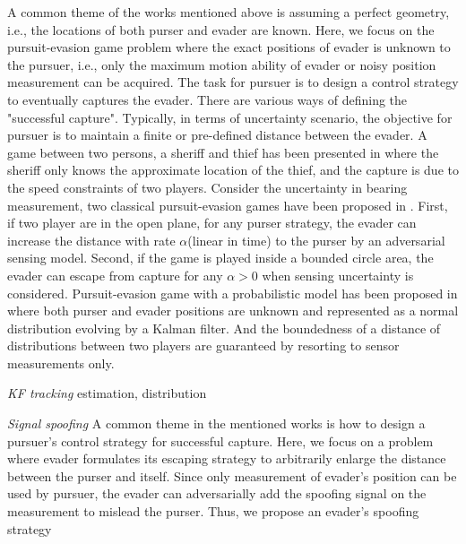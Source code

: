 \documentclass[letterpaper, 10 pt, conference]{ieeeconf}  %
\begin{document}
A common theme of the works mentioned above is assuming a perfect geometry, i.e., the locations of both purser and evader are known. Here, we focus on the pursuit-evasion game problem where the exact positions of evader is unknown to the pursuer, i.e., only the maximum motion ability of evader or noisy position measurement can be acquired\cite{guibas1999visibility,rote2003pursuit,lavalle2006planning,jun2014pursuit,vander2014pursuit,aleem2015self}. The task for pursuer is to design a control strategy to eventually captures the evader. There are various ways of defining the "successful capture". Typically, in terms of uncertainty scenario, the objective for pursuer is to maintain a finite or pre-defined distance between the evader\cite{jun2014pursuit}. A game between two persons, a sheriff and thief has been presented in \cite{rote2003pursuit} where the sheriff only knows the approximate location of the thief, and the capture is due to the speed constraints of two players. Consider the uncertainty in bearing measurement, two classical pursuit-evasion games have been proposed in \cite{vander2014pursuit}. First, if two player are in the open plane, for any purser strategy, the evader can increase the distance with rate $\alpha$(linear in time) to the purser by an adversarial sensing model. Second, if the game is played inside a bounded circle area, the evader can escape from capture for any $\alpha>0$ when sensing uncertainty is considered. %
Pursuit-evasion game with a probabilistic model has been proposed in \cite{jun2014pursuit} where both purser and evader positions are unknown and represented as a normal distribution evolving by a Kalman filter. And the boundedness of a distance of distributions between two players are guaranteed by resorting to sensor measurements only. 

\emph{KF tracking} estimation, distribution

\emph{Signal spoofing} A common theme in the mentioned works is how to design a pursuer's control strategy for successful capture. Here, we focus on a problem where evader formulates its escaping strategy to arbitrarily enlarge the distance between the purser and itself. Since only measurement of evader's position can be used by pursuer, the evader can adversarially add the spoofing signal on the measurement to mislead the purser. Thus, we propose an evader's spoofing strategy 
\end{document}
